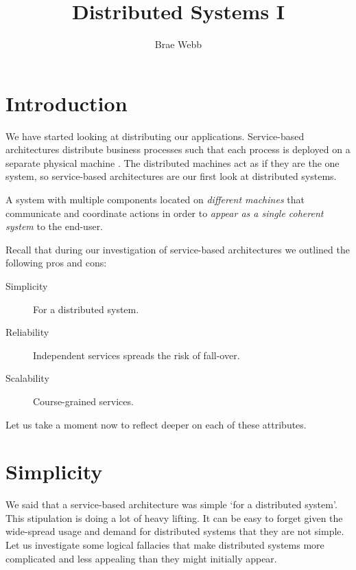 \title{Distributed Systems I}
\author{Brae Webb}
\date{}

\maketitle

\section{Introduction}
We have started looking at distributing our applications.
Service-based architectures distribute business processes such that each process is deployed on a separate physical machine \cite{service-based-notes}.
The distributed machines act as if they are the one system,
so service-based architectures are our first look at distributed systems.

\begin{definition}
A system with multiple components located on \textsl{different machines} that communicate and coordinate actions in order to \textsl{appear as a single coherent system} to the end-user.
\end{definition}

\noindent Recall that during our investigation of service-based architectures we outlined the following pros and cons:
\begin{description}
    \item[Simplicity] For a distributed system.
    \item[Reliability] Independent services spreads the risk of fall-over.
    \item[Scalability] Course-grained services.
\end{description}

\noindent Let us take a moment now to reflect deeper on each of these attributes.

\section{Simplicity}
We said that a service-based architecture was simple `for a distributed system'.
This stipulation is doing a lot of heavy lifting.
It can be easy to forget given the wide-spread usage and demand for distributed systems that they are not simple.
%
Let us investigate some logical fallacies that make distributed systems more complicated and less appealing than they might initially appear.

